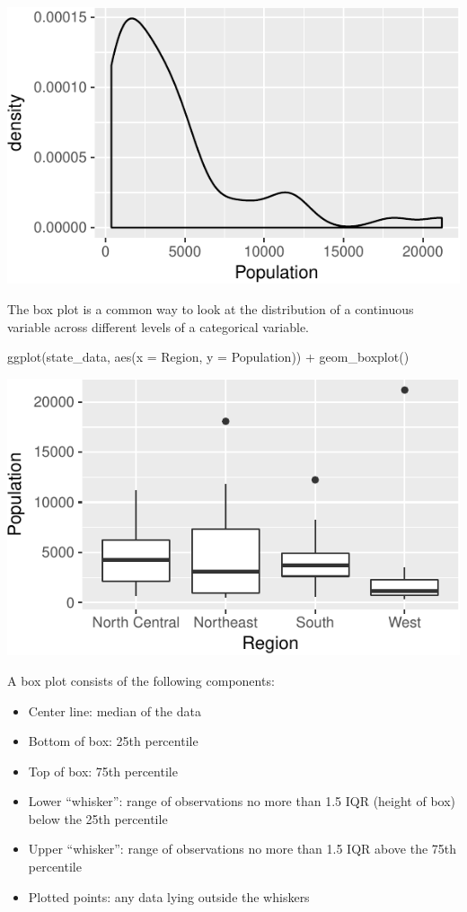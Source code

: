 \documentclass[
  12pt,
  oneside,openany]{book}
\newenvironment{Shaded}{\begin{snugshade}}{\end{snugshade}}
\newcommand{\AttributeTok}[1]{\textcolor[rgb]{0.77,0.63,0.00}{#1}}
\newcommand{\FunctionTok}[1]{\textcolor[rgb]{0.00,0.00,0.00}{#1}}
\newcommand{\NormalTok}[1]{#1}
\newcommand{\SpecialCharTok}[1]{\textcolor[rgb]{0.00,0.00,0.00}{#1}}
\providecommand{\tightlist}{%
  \setlength{\itemsep}{0pt}\setlength{\parskip}{0pt}}
\begin{document}
\includegraphics{pdaps_files/figure-latex/density-1.pdf}

The box plot is a common way to look at the distribution of a continuous variable across different levels of a categorical variable.

\begin{Shaded}
\begin{Highlighting}[]
\FunctionTok{ggplot}\NormalTok{(state\_data, }\FunctionTok{aes}\NormalTok{(}\AttributeTok{x =}\NormalTok{ Region, }\AttributeTok{y =}\NormalTok{ Population)) }\SpecialCharTok{+}
  \FunctionTok{geom\_boxplot}\NormalTok{()}
\end{Highlighting}
\end{Shaded}

\includegraphics{pdaps_files/figure-latex/boxplot-1.pdf}

A box plot consists of the following components:

\begin{itemize}
\tightlist
\item
  Center line: median of the data
\item
  Bottom of box: 25th percentile
\item
  Top of box: 75th percentile
\item
  Lower ``whisker'': range of observations no more than 1.5 IQR (height of box) below the 25th percentile
\item
  Upper ``whisker'': range of observations no more than 1.5 IQR above the 75th percentile
\item
  Plotted points: any data lying outside the whiskers
\end{itemize}
\end{document}
